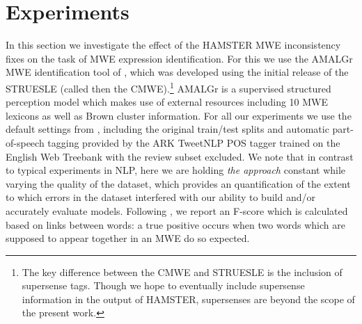 \documentclass[output=paper
,modfonts
,nonflat]{langsci/langscibook}
\newcommand{\zp}{\phantom{0}}
\begin{document}

\section{Experiments}


In this section we investigate the effect of the HAMSTER MWE inconsistency fixes on the task of MWE expression identification. For this we use the AMALGr MWE identification tool of \citet{Schneider14b}, which was developed using the initial release of the STRUESLE (called then the CMWE).\footnote{The key difference between the CMWE and STRUESLE is the inclusion of supersense tags. Though we hope to eventually include supersense information in the output of HAMSTER, supersenses are beyond the scope of the present work.} AMALGr is a supervised structured perception model which makes use of external resources including 10 MWE lexicons as well as Brown cluster information. For all our experiments we use the default settings from \citet{Schneider14b}, including the original train/test splits and automatic part-of-speech tagging provided by the ARK TweetNLP POS tagger \citep{Owoputi13} trained on the English Web Treebank with the review subset excluded. We note that in contrast to typical experiments in NLP, here we are holding \textit{the approach} constant while varying the quality of the dataset, which provides an quantification of the extent to which errors in the dataset interfered with our ability to build and/or accurately evaluate models. Following \citet{Schneider14b}, we report an F-score which is calculated based on links between words: a true positive occurs when two words which are supposed to appear together in an MWE do so expected.
\end{document}
